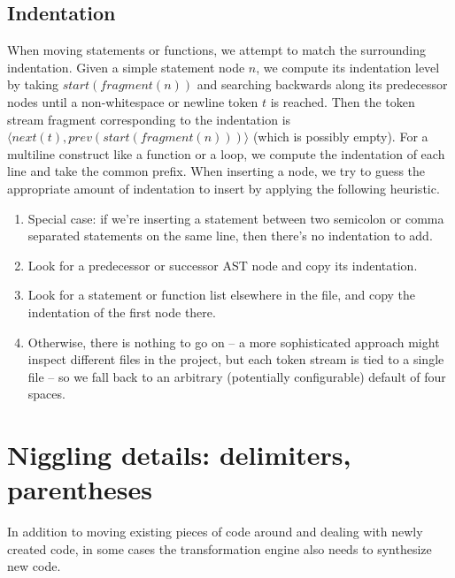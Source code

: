 
\subsection{Indentation}

When moving statements or functions, we attempt to match the surrounding
indentation. Given a simple statement node $n$, we compute its indentation
level by taking $start(fragment(n))$ and searching backwards along its
predecessor nodes until a non-whitespace or newline token $t$ is reached. Then
the token stream fragment corresponding to the indentation is \newline $\langle
next(t), prev(start(fragment(n))) \rangle$ (which is possibly empty). For a
multiline construct like a function or a loop, we compute the indentation of
each line and take the common prefix. When inserting a node, we try to guess
the appropriate amount of indentation to insert by applying the following
heuristic.

\begin{enumerate}
  \item Special case: if we're inserting a statement between two semicolon or
    comma separated statements on the same line, then there's no indentation to
    add.
  \item Look for a predecessor or successor AST node and copy its indentation.
  \item Look for a statement or function list elsewhere in the file, and copy
    the indentation of the first node there.
  \item Otherwise, there is nothing to go on -- a more sophisticated approach
    might inspect different files in the project, but each token stream is tied
    to a single file -- so we fall back to an arbitrary (potentially configurable)
    default of four spaces.
\end{enumerate}

\section{Niggling details: delimiters, parentheses}

In addition to moving existing pieces of code around and dealing with newly
created code, in some cases the transformation engine also needs to synthesize
new code.

